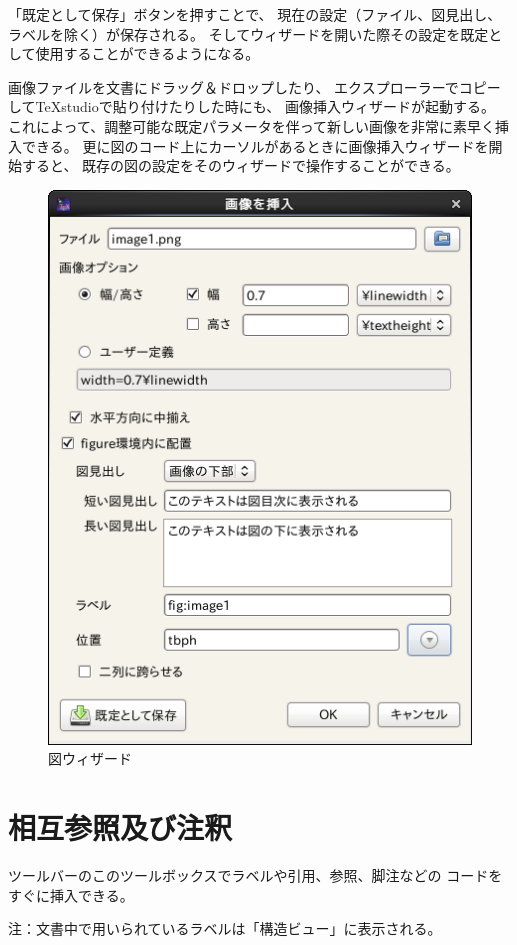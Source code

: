 「既定として保存」ボタンを押すことで、
現在の設定（ファイル、図見出し、ラベルを除く）が保存される。
そしてウィザードを開いた際その設定を既定として使用することができるようになる。

画像ファイルを文書にドラッグ＆ドロップしたり、
エクスプローラーでコピーしてTeXstudioで貼り付けたりした時にも、
画像挿入ウィザードが起動する。
これによって、調整可能な既定パラメータを伴って新しい画像を非常に素早く挿入できる。
更に図のコード上にカーソルがあるときに画像挿入ウィザードを開始すると、
既存の図の設定をそのウィザードで操作することができる。

\begin{figure}[H]
  \centering
  \includegraphics{wizard_figure.png}
  \caption{図ウィザード}
\end{figure}

\section{相互参照及び注釈}

ツールバーのこのツールボックスでラベルや引用、参照、脚注などの
コードをすぐに挿入できる。

注：文書中で用いられているラベルは「構造ビュー」に表示される。

